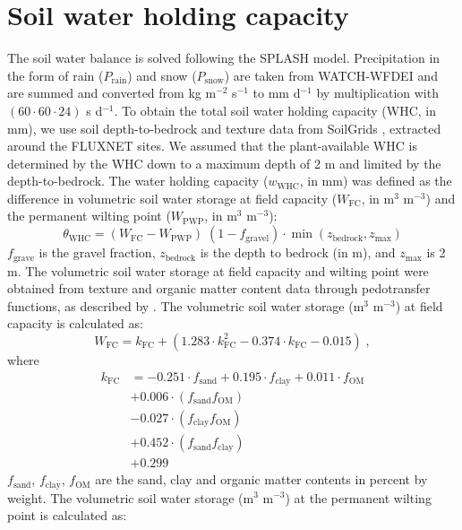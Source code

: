 \documentclass[gmd, manuscript]{copernicus}
\begin{document}
\section{Soil water holding capacity}
\label{sec:whc}
The soil water balance is solved following the SPLASH model. Precipitation in the form of rain ($P_{\text{rain}}$) and snow ($P_{\text{snow}}$) are taken from WATCH-WFDEI \citep{Weedon2014-nv} and are summed and converted from kg m$^{-2}$ s$^{-1}$ to mm d$^{-1}$ by multiplication with $(60 \cdot 60 \cdot 24)$ s d$^{-1}$. To obtain the total soil water holding capacity (WHC, in mm), we use soil depth-to-bedrock and texture data from SoilGrids \citep{Hengl2014-jm}, extracted around the FLUXNET sites. We assumed that the plant-available WHC is determined by the WHC down to a maximum depth of 2 m and limited by the depth-to-bedrock. The water holding capacity ($w_\text{WHC}$, in mm) was defined as the difference in volumetric soil water storage at field capacity ($W_{\text{FC}}$, in m$^3$ m$^{-3}$) and the permanent wilting point ($W_{\text{PWP}}$, in m$^3$ m$^{-3}$):
\begin{equation}
\theta_\text{WHC} = (W_{\text{FC}} - W_{\text{PWP}}) \; (1-f_\text{gravel})\cdot \min(z_\text{bedrock}, z_\text{max})
\end{equation}
$f_\text{grave}$ is the gravel fraction, $z_\text{bedrock}$ is the depth to bedrock (in m), and $z_\text{max}$ is 2 m. The volumetric soil water storage at field capacity and wilting point were obtained from texture and organic matter content data through pedotransfer functions, as described by \citet{saxton06}. The volumetric soil water storage (m$^3$ m$^{-3}$) at field capacity is calculated as:
\begin{equation}
W_{\text{FC}}= k_\text{FC}+(1.283\cdot k_\text{FC}^{2}-0.374\cdot k_\text{FC}-0.015)\;, 
\end{equation}
where
\begin{align}
k_\text{FC} &=-0.251\cdot f_{\text{sand}} + 0.195\cdot f_{\text{clay}} + 0.011\cdot f_{\text{OM}}\\                            
&+ 0.006\cdot (f_{\text{sand}} f_{\text{OM}})\\
&- 0.027\cdot (f_{\text{clay}} f_{\text{OM}})\\
&+ 0.452\cdot (f_{\text{sand}} f_{\text{clay}})\\
&+ 0.299
\end{align}
$f_{\text{sand}}$, $f_{\text{clay}}$, $f_{\text{OM}}$ are the sand, clay and organic matter contents in percent by weight. The volumetric soil water storage (m$^3$ m$^{-3}$) at the permanent wilting point is calculated as:
\end{document}
